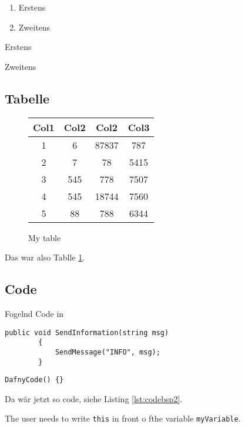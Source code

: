 \begin{enumerate}
    \item Erstens
    \item Zweitens
\end{enumerate}

\begin{description}
    \item Erstens
    \item Zweitens
\end{description}

\subsection{Tabelle}
\begin{figure}[!h]
    \centering
  \begin{tabular}{| c | c | c | c |}
    \hline
    Col1 & Col2 & Col2 & Col3 \\ [0.5ex]
    \hline\hline
    1 & 6 & 87837 & 787 \\
    \hline
    2 & 7 & 78 & 5415 \\
    \hline
    3 & 545 & 778 & 7507 \\
    \hline
    4 & 545 & 18744 & 7560 \\
    \hline
    5 & 88 & 788 & 6344 \\ [1ex]
    \hline
  \end{tabular}
  \label{tab:tabbsp}
  \caption{My table}
\end{figure}
Das war also Tablle \ref{tab:tabbsp}.

\subsection{Code}
Fogelnd Code in \Csharp
\lstset{style=sharpc}
\begin{lstlisting}[caption={My Caption}, captionpos=b, label={lst:codebsp}]
        public void SendInformation(string msg)
        {
            SendMessage("INFO", msg);
        }
\end{lstlisting}

\lstset{style=dafny}
\begin{lstlisting}[caption={My Caption}, captionpos=b, label={lst:codebsp2}]
        DafnyCode() {}
\end{lstlisting}
Da wär jetzt so code, siehe Listing \ref{lst:codebsp2}.

The user needs to write \texttt{this} in front o fthe variable \texttt{myVariable}.

